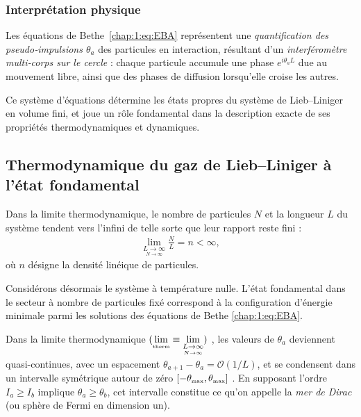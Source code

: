 \subsubsection{Interprétation physique}

Les équations de Bethe~\eqref{chap:1:eq:EBA} représentent une {\em quantification des pseudo‑impulsions $\theta_a$} des particules en interaction, résultant d’un {\em interféromètre multi‑corps sur le cercle} : chaque particule accumule une phase $e^{i \theta_a L}$ due au mouvement libre, ainsi que des phases de diffusion lorsqu’elle croise les autres.

Ce système d'équations détermine les états propres du système de Lieb–Liniger en volume fini, et joue un rôle fondamental dans la description exacte de ses propriétés thermodynamiques et dynamiques.


\subsection{Thermodynamique du gaz de Lieb–Liniger à l'état fondamental}

Dans la limite thermodynamique, le nombre de particules \( N \) et la longueur \( L \) du système tendent vers l'infini de telle sorte que leur rapport reste fini :
\begin{eqnarray*}
	\lim_{\underset{ N \to \infty}{L \to \infty}} \frac{N}{L} = n < \infty,
\end{eqnarray*}
où \( n \) désigne la densité linéique de particules.

\medskip

Considérons désormais le système à température nulle. L’état fondamental dans le secteur à nombre de particules fixé correspond à la configuration d’énergie minimale parmi les solutions des équations de Bethe \eqref{chap:1:eq:EBA}.

Dans la limite thermodynamique $(\underset{\text{\tiny therm}}{\lim} \equiv \underset{\underset{ N \to \infty}{L \to \infty}}{\lim} )$ , les valeurs de \( \theta_a \) deviennent quasi-continues, avec un espacement \( \theta_{a+1} - \theta_a = \mathcal{O}(1/L) \), et se condensent dans un intervalle symétrique autour de zéro $[-\theta_{\mbox{\tiny max}} , \theta_{\mbox{\tiny max}} ]$ . En supposant l'ordre \( I_a \geq I_b  \) implique \(\theta_a \geq \theta_b \), cet intervalle constitue ce qu'on appelle la {\em mer de Dirac} (ou sphère de Fermi en dimension un).

